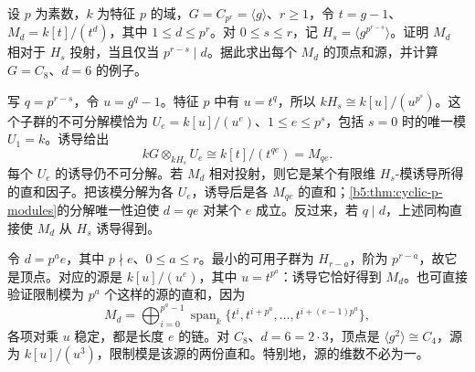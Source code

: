 \begin{optionalexercise}\label{b5:ex:08-cyclic-vertices-sources}
	设 \(p\) 为素数，\(k\) 为特征 \(p\) 的域，\(G=C_{p^r}=\langle g\rangle\)、\(r\ge1\)，令 \(t=g-1\)、\(M_d=k[t]/(t^d)\)，其中 \(1\le d\le p^r\)。对 \(0\le s\le r\)，记 \(H_s=\langle g^{p^{r-s}}\rangle\)。证明 \(M_d\) 相对于 \(H_s\) 投射，当且仅当 \(p^{r-s}\mid d\)。据此求出每个 \(M_d\) 的顶点和源，并计算 \(G=C_8\)、\(d=6\) 的例子。
\end{optionalexercise}
\begin{solution}
	写 \(q=p^{r-s}\)，令 \(u=g^q-1\)。特征 \(p\) 中有 \(u=t^q\)，所以 \(kH_s\cong k[u]/(u^{p^s})\)。这个子群的不可分解模恰为 \(U_e=k[u]/(u^e)\)、\(1\le e\le p^s\)，包括 \(s=0\) 时的唯一模 \(U_1=k\)。诱导给出
	\[
		kG\otimes_{kH_s}U_e\cong k[t]/(t^{qe})=M_{qe}.
	\]
	每个 \(U_e\) 的诱导仍不可分解。若 \(M_d\) 相对投射，则它是某个有限维 \(H_s\)-模诱导所得的直和因子。把该模分解为各 \(U_e\)，诱导后是各 \(M_{qe}\) 的直和；\cref{b5:thm:cyclic-p-modules}的分解唯一性迫使 \(d=qe\) 对某个 \(e\) 成立。反过来，若 \(q\mid d\)，上述同构直接使 \(M_d\) 从 \(H_s\) 诱导得到。

	令 \(d=p^a e\)，其中 \(p\nmid e\)、\(0\le a\le r\)。最小的可用子群为 \(H_{r-a}\)，阶为 \(p^{r-a}\)，故它是顶点。对应的源是 \(k[u]/(u^e)\)，其中 \(u=t^{p^a}\)：诱导它恰好得到 \(M_d\)。也可直接验证限制模为 \(p^a\) 个这样的源的直和，因为
	\[
		M_d=\bigoplus_{i=0}^{p^a-1}
		\operatorname{span}_k\{t^i,t^{i+p^a},\ldots,t^{i+(e-1)p^a}\},
	\]
	各项对乘 \(u\) 稳定，都是长度 \(e\) 的链。对 \(C_8\)、\(d=6=2\cdot3\)，顶点是 \(\langle g^2\rangle\cong C_4\)，源为 \(k[u]/(u^3)\)，限制模是该源的两份直和。特别地，源的维数不必为一。
\end{solution}

